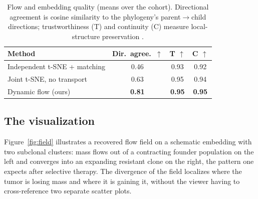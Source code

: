 \documentclass{article}
\begin{document}
\begin{table}[t]
\caption{Flow and embedding quality (means over the cohort). Directional agreement is
cosine similarity to the phylogeny's parent$\rightarrow$child directions;
trustworthiness (T) and continuity (C) measure local-structure preservation
\citep{Venna2006}.}
\label{tab:quant}
\centering
\small
\begin{tabular}{lccc}
\toprule
Method & Dir.\ agree.\ $\uparrow$ & T $\uparrow$ & C $\uparrow$ \\
\midrule
Independent t-SNE + matching & 0.46 & 0.93 & 0.92 \\
Joint t-SNE, no transport    & 0.63 & 0.95 & 0.94 \\
Dynamic flow (ours)          & \textbf{0.81} & \textbf{0.95} & \textbf{0.95} \\
\bottomrule
\end{tabular}
\end{table}

\subsection{The visualization}

Figure~\ref{fig:field} illustrates a recovered flow field on a schematic embedding
with two subclonal clusters: mass flows out of a contracting founder population on the
left and converges into an expanding resistant clone on the right, the pattern one
expects after selective therapy. The divergence of the field localizes where the tumor
is losing mass and where it is gaining it, without the viewer having to cross-reference
two separate scatter plots.
\end{document}

